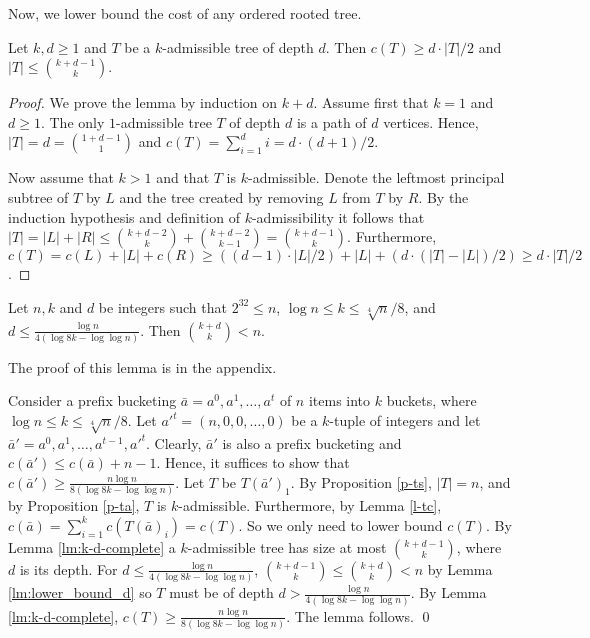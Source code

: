 \documentclass[runningheads,a4paper]{llncs}
\newenvironment{proofof}[1]{\noindent{\it Proof of #1. }} {{\qed}}
\begin{document}
Now, we lower bound the cost of any ordered rooted tree.

\begin{lemma}

\label{lm:k-d-complete}
Let $k,d \geq 1$ and $T$ be a $k$-admissible tree of depth $d$.
Then $c(T) \geq d \cdot |T| / 2$ and $|T| \leq \binom{k + d - 1}{k}$.
\end{lemma}
\begin{proof}
We prove the lemma by induction on $k + d$. Assume first that $k = 1$ and $d \geq 1$.
The only $1$-admissible tree $T$ of depth $d$ is a path of $d$ vertices. Hence,
$|T| = d = \binom{1 + d - 1}{1}$ and $c(T)=\sum_{i = 1}^d i  = d \cdot (d + 1) / 2$.

Now assume that $k > 1$ and that $T$ is $k$-admissible.
Denote the leftmost principal subtree of $T$ by $L$ and the tree created by removing $L$ from $T$ by $R$.
By the induction hypothesis and definition of $k$-admissibility it follows that $|T| = |L| + |R| \leq \binom{k + d - 2}{k} + \binom{k + d - 2}{k - 1} = \binom{k + d - 1}{k}$.
Furthermore, $c(T) = c(L) + |L| +  c(R) \geq ((d-1) \cdot |L|  / 2) + |L| + (d \cdot (|T| - |L|) / 2) \geq d \cdot |T| / 2$.
\end{proof}

\begin{lemma}
\label{lm:lower_bound_d} 
Let $n,k$ and $d$ be integers such that $2^{32} \leq n$, $\log n \le k \le \sqrt[4]{n}/8$, and 
$d \le \frac{\log n}{4 (\log 8k - \log \log n)}$. Then ${k+d \choose k} < n$. 
\end{lemma}

The proof of this lemma is in the appendix.

\begin{proofof}{Lemma \ref{l-lbb}}
Consider a prefix bucketing $\bar{a} = a^0,a^1,\dots,a^t$ of $n$ items into $k$ buckets, 
where $\log n \le k \le \sqrt[4]{n}/8$. Let $a'^t = (n,0,0,\dots,0)$ be a $k$-tuple of integers and
let  $\bar{a}' = a^0,a^1,\dots,a^{t-1},a'^t$. Clearly, $\bar{a}'$ is also a prefix bucketing and $c(\bar{a}') \le c(\bar{a}) + n-1$. Hence, it suffices to 
show that $c(\bar{a}') \ge  \frac{n \log n}{8 (\log 8k - \log \log n)}$. Let $T$ be $T(\bar{a}')_1$. By Proposition \ref{p-ts}, $|T|=n$, and by Proposition \ref{p-ta}, $T$ is $k$-admissible.
Furthermore, by Lemma \ref{l-tc},  $c(\bar{a}) = \sum_{i=1}^k c(T(\bar{a})_i) = c(T)$. So we only need to lower bound $c(T)$. By Lemma \ref{lm:k-d-complete}
a $k$-admissible tree has size at most $\binom{k + d - 1}{k}$, where $d$ is its depth. For $d \le  \frac{\log n}{4 (\log 8k - \log \log n)}$,  $\binom{k + d - 1}{k} \le \binom{k + d}{k} < n$
by Lemma \ref{lm:lower_bound_d} so $T$ must be of depth $d > \frac{\log n}{4 (\log 8k - \log \log n)}$.
By Lemma \ref{lm:k-d-complete}, $c(T) \ge \frac{n \log n}{8 (\log 8k - \log \log n)}$. The lemma follows.
\end{proofof}
\end{document}
